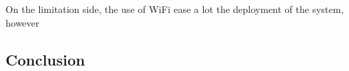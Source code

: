 On the limitation side, the use of WiFi ease a lot the deployment of the system, however 

\subsection{Conclusion}

